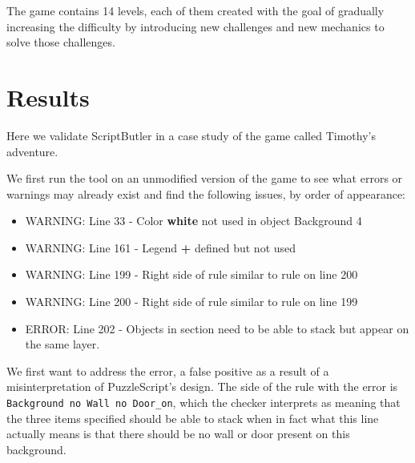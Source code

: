 
The game contains 14 levels, each of them created with the goal of gradually increasing the difficulty by introducing new challenges and new mechanics to solve those challenges. 

\section{Results}
Here we validate ScriptButler in a case study of the game called Timothy's adventure.

We first run the tool on an unmodified version of the game to see what errors or warnings may already exist and find the following issues, by order of appearance:
\begin{itemize}
    \item WARNING: Line 33 - Color \textbf{white} not used in object Background 4
    \item WARNING: Line 161 - Legend \textbf{ + } defined but not used
    \item WARNING: Line 199 - Right side of rule similar to rule on line 200
    \item WARNING: Line 200 - Right side of rule similar to rule on line 199
    \item ERROR: Line 202 - Objects in section need to be able to stack but appear on the same layer.
\end{itemize}

We first want to address the error, a false positive as a result of a misinterpretation of PuzzleScript's design. The side of the rule with the error is \texttt{Background no Wall no Door\_on}, which the checker interprets as meaning that the three items specified should be able to stack when in fact what this line actually means is that there should be no wall or door present on this background.


